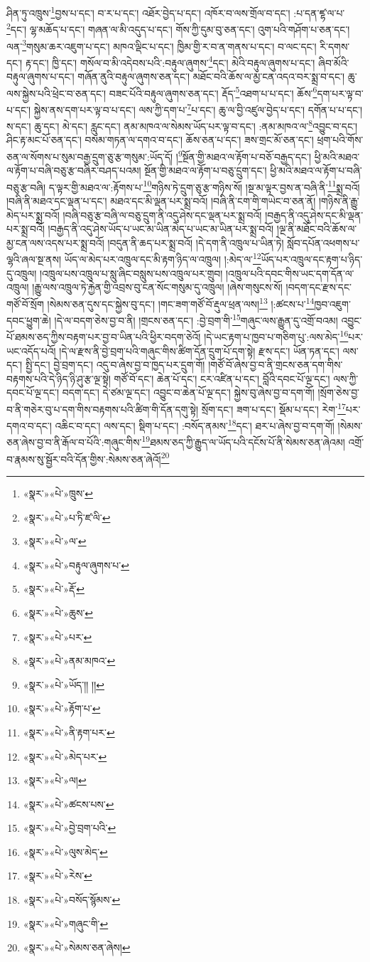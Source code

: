 ཤིན་ཏུ་འཁྲུས་\footnote{«སྣར་»«པེ་»ཁྲུས་}བྱས་པ་དང་། བ་ར་པ་དང་། འཐོར་བྱེད་པ་དང་། འཁོར་བ་ལས་གྲོལ་བ་དང་། :པ་དན་ཛྷ་ལ་པ་\footnote{«སྣར་»«པེ་»པ་ཏི་ཛ་ལི་}དང་། ལྷ་མཆོད་པ་དང་། གཞན་ལ་མི་འདུད་པ་དང་། གོས་ཀྱི་དུམ་བུ་ཅན་དང་། འུག་པའི་གཤོག་པ་ཅན་དང་། ལན་\footnote{«སྣར་»«པེ་»ལ་}གསུམ་ཆར་འཇུག་པ་དང་། མཁའ་ལྡིང་པ་དང་། ཁྱིམ་གྱི་ར་བ་ན་གནས་པ་དང་། བ་ལང་དང་། རི་དགས་དང་། རྟ་དང་། ཁྱི་དང་། གསོལ་བ་མི་འདེབས་པའི་:བརྟུལ་ཞུགས་\footnote{«སྣར་»«པེ་»བརྟུལ་ཞུགས་པ་}དང་། མེའི་བརྟུལ་ཞུགས་པ་དང་། ཞིབ་མོའི་བརྟུལ་ཞུགས་པ་དང་། གཞོན་ནུའི་བརྟུལ་ཞུགས་ཅན་དང་། མཐོང་བའི་ཆོས་ལ་མྱ་ངན་འདའ་བར་སྨྲ་བ་དང་། ཆུ་ལས་སྐྱེས་པའི་ཕྲེང་བ་ཅན་དང་། བཟང་པོའི་བརྟུལ་ཞུགས་ཅན་དང་། རྡོད་\footnote{«སྣར་»«པེ་»རྡོ་}འཐག་པ་པ་དང་། ཆོས་\footnote{«སྣར་»«པེ་»ཆུས་}དག་པར་ལྟ་བ་པ་དང་། སྐྱེས་ནས་དག་པར་ལྟ་བ་པ་དང་། ལས་ཀྱི་དག་པ་\footnote{«སྣར་»«པེ་»པར་}པ་དང་། ཆུ་ལ་བྱི་འཛུལ་བྱེད་པ་དང་། དགོན་པ་པ་དང་། ས་དང་། ཆུ་དང་། མེ་དང་། རླུང་དང་། ནམ་མཁའ་ལ་སེམས་ཡོད་པར་ལྟ་བ་དང་། :ནམ་མཁའ་ལ་\footnote{«སྣར་»«པེ་»ནམ་མཁའ་}འབྱུང་བ་དང་། ཤིང་རྟ་མང་པོ་ཅན་དང་། བསམ་གཏན་ལ་དགའ་བ་དང་། ཆོས་ཅན་པ་དང་། ཟས་གྲང་མོ་ཅན་དང་། ཕྲག་པའི་གོས་ཅན་ལ་སོགས་པ་སུམ་བརྒྱ་དྲུག་ཅུ་རྩ་གསུམ་:ཡོད་དོ། །\footnote{«སྣར་»«པེ་»ཡོད་།། །།}སྔོན་གྱི་མཐའ་ལ་རྟོག་པ་བཅོ་བརྒྱད་དང་། ཕྱི་མའི་མཐའ་ལ་རྟོག་པ་བཞི་བཅུ་རྩ་བཞིར་བཤད་པའམ། སྔོན་གྱི་མཐའ་ལ་རྟོག་པ་བཅུ་དྲུག་དང་། ཕྱི་མའི་མཐའ་ལ་རྟོག་པ་བཞི་བཅུ་རྩ་བཞི། ད་ལྟར་གྱི་མཐའ་ལ་:རྟོགས་པ་\footnote{«སྣར་»«པེ་»རྟོག་པ་}གཉིས་ཏེ་དྲུག་ཅུ་རྩ་གཉིས་སོ། །སྔ་མ་ལྟར་བྱས་ན་བཞི་ནི་\footnote{«སྣར་»«པེ་»ནི་རྟག་པར་}སྨྲ་བའོ། །བཞི་ནི་མཐའ་དང་ལྡན་པ་དང་། མཐའ་དང་མི་ལྡན་པར་སྨྲ་བའོ། །བཞི་ནི་ངག་གི་གཡེང་བ་ཅན་ནོ། །གཉིས་ནི་རྒྱུ་མེད་པར་སྨྲ་བའོ། །བཞི་བཅུ་རྩ་བཞི་ལ་བཅུ་དྲུག་ནི་འདུ་ཤེས་དང་ལྡན་པར་སྨྲ་བའོ། །བརྒྱད་ནི་འདུ་ཤེས་དང་མི་ལྡན་པར་སྨྲ་བའོ། །བརྒྱད་ནི་འདུ་ཤེས་ཡོད་པ་ཡང་མ་ཡིན་མེད་པ་ཡང་མ་ཡིན་པར་སྨྲ་བའོ། །ལྔ་ནི་མཐོང་བའི་ཆོས་ལ་མྱ་ངན་ལས་འདས་པར་སྨྲ་བའོ། །བདུན་ནི་ཆད་པར་སྨྲ་བའོ། །དེ་དག་ནི་འཁྲུལ་པ་ཡིན་ཏེ། སློབ་དཔོན་འཕགས་པ་ལྷའི་ཞལ་སྔ་ནས། ཡོད་ལ་མེད་པར་འཁྲུལ་དང་མི་རྟག་ཉིད་ལ་འཁྲུལ། །:མེད་ལ་\footnote{«སྣར་»«པེ་»མེད་པར་}ཡོད་པར་འཁྲུལ་དང་རྟག་པ་ཉིད་དུ་འཁྲུལ། །འཁྲུལ་པས་འཁྲུལ་པ་སླུ་ཞིང་བསླུས་པས་འཁྲུལ་པར་གྲུབ། །འཁྲུལ་པའི་དབང་གིས་ཡང་དག་དོན་ལ་འཁྲུལ། །རྒྱུ་ལས་འཁྲུལ་ཏེ་རྐྱེན་གྱི་འབྲས་བུ་ངན་སོང་གསུམ་དུ་འཁྲུལ། །ཞེས་གསུངས་སོ། །བདག་དང་རྫས་དང་གཙོ་བོ་སྲོག །སེམས་ཅན་དུས་དང་སྐྱེས་བུ་དང་། །གང་ཟག་གཙོ་བོ་རྡུལ་ཕྲན་ལས།\footnote{«སྣར་»«པེ་»ལ།} །:ཚངས་པ་\footnote{«སྣར་»«པེ་»ཚངས་པས་}ཁྱབ་འཇུག་དབང་ཕྱུག་ཆེ། །དེ་ལ་བདག་ཅེས་བྱ་བ་ནི། །གྲངས་ཅན་དང་། :བྱེ་བྲག་གི་\footnote{«སྣར་»«པེ་»བྱེ་བྲག་པའི་}གཞུང་ལས་རྒྱུན་དུ་འགྲོ་བའམ། འབྱུང་པོ་ཐམས་ཅད་ཀྱིས་བརྟག་པར་བྱ་བ་ཡིན་པའི་ཕྱིར་བདག་ཅེའོ། །དེ་ཡང་རྟག་པ་ཁྱབ་པ་གཅིག་པུ་:ལས་མེད་\footnote{«སྣར་»«པེ་»ལུས་མེད་}པར་ཡང་འདོད་པའོ། །དེ་ལ་རྫས་ནི་བྱེ་བྲག་པའི་གཞུང་གིས་ཚིག་དོན་དྲུག་པོ་དག་སྟེ། རྫས་དང་། ཡོན་ཏན་དང་། ལས་དང་། སྤྱི་དང་། བྱེ་བྲག་དང་། འདུ་བ་ཞེས་བྱ་བ་ཁྱད་པར་དྲུག་གོ། །གཙོ་བོ་ཞེས་བྱ་བ་ནི་གྲངས་ཅན་དག་གིས་བརྟགས་པའི་དེ་ཉིད་ཉི་ཤུ་རྩ་ལྔ་སྟེ། གཙོ་བོ་དང་། ཆེན་པོ་དང་། ངར་འཛིན་པ་དང་། བློའི་དབང་པོ་ལྔ་དང་། ལས་ཀྱི་དབང་པོ་ལྔ་དང་། བདག་དང་། དེ་ཙམ་ལྔ་དང་། འབྱུང་བ་ཆེན་པོ་ལྔ་དང་། སྐྱེས་བུ་ཞེས་བྱ་བ་དག་གོ། །སྲོག་ཅེས་བྱ་བ་ནི་གཅེར་བུ་པ་དག་གིས་བརྟགས་པའི་ཚིག་གི་དོན་དགུ་སྟེ། སྲོག་དང་། ཟག་པ་དང་། སྡོམ་པ་དང་། རེག་\footnote{«སྣར་»«པེ་»རེས་}པར་དགའ་བ་དང་། འཆིང་བ་དང་། ལས་དང་། སྡིག་པ་དང་། :བསོད་ནམས་\footnote{«སྣར་»«པེ་»བསོད་སྙོམས་}དང་། ཐར་པ་ཞེས་བྱ་བ་དག་གོ། །སེམས་ཅན་ཞེས་བྱ་བ་ནི་རྒོལ་བ་པོའི་:གཞུང་གིས་\footnote{«སྣར་»«པེ་»གཞུང་གི་}ཐམས་ཅད་ཀྱི་རྒྱུད་ལ་ཡོད་པའི་དངོས་པོ་ནི་སེམས་ཅན་ཞེའམ། འགྲོ་བ་རྣམས་སུ་སྦྱོར་བའི་དོན་གྱིས་:སེམས་ཅན་ཞེའོ།\footnote{«སྣར་»«པེ་»སེམས་ཅན་ཞེས།} 